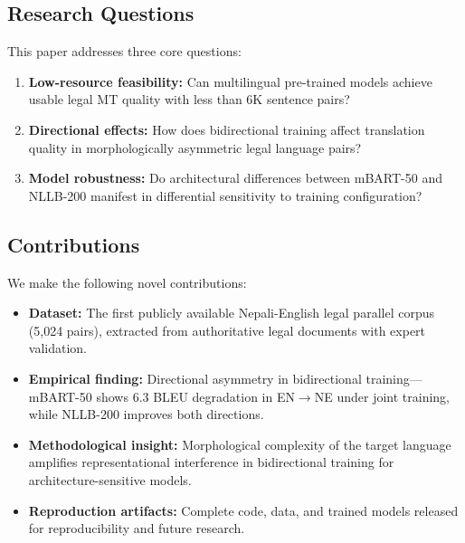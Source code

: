 \documentclass[manuscript, screen, review]{acmart}
\begin{document}
\subsection{Research Questions}
\label{subsec:rq}

This paper addresses three core questions:

\begin{enumerate}
\item \textbf{Low-resource feasibility:} Can multilingual pre-trained models achieve usable legal MT quality with less than 6K sentence pairs?

\item \textbf{Directional effects:} How does bidirectional training affect translation quality in morphologically asymmetric legal language pairs?

\item \textbf{Model robustness:} Do architectural differences between mBART-50 and NLLB-200 manifest in differential sensitivity to training configuration?
\end{enumerate}

\subsection{Contributions}
\label{subsec:contrib}

We make the following novel contributions:

\begin{itemize}
\item \textbf{Dataset:} The first publicly available Nepali-English legal parallel corpus (5,024 pairs), extracted from authoritative legal documents with expert validation.

\item \textbf{Empirical finding:} Directional asymmetry in bidirectional training—mBART-50 shows 6.3 BLEU degradation in EN$\rightarrow$NE under joint training, while NLLB-200 improves both directions.

\item \textbf{Methodological insight:} Morphological complexity of the target language amplifies representational interference in bidirectional training for architecture-sensitive models.

\item \textbf{Reproduction artifacts:} Complete code, data, and trained models released for reproducibility and future research.
\end{itemize}
\end{document}
